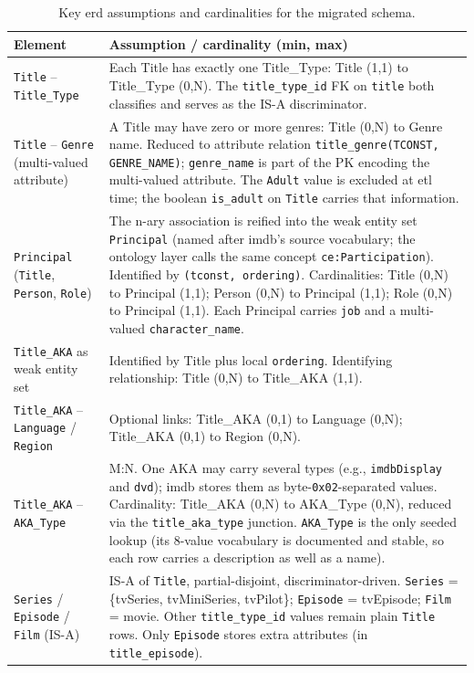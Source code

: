 \begin{table}[H]
\centering
\small
\caption{Key \ac{erd} assumptions and cardinalities for the migrated schema.}
\label{tab:erd-assumptions}
\begin{tabularx}{\textwidth}{lX}
\hline
\textbf{Element} & \textbf{Assumption / cardinality (min, max)} \\
\hline
\texttt{Title} -- \texttt{Title\_Type} & Each Title has exactly one Title\_Type: Title (1,1) to Title\_Type (0,N). The \texttt{title\_type\_id} FK on \texttt{title} both classifies and serves as the IS-A discriminator. \\
\texttt{Title} -- \texttt{Genre} (multi-valued attribute) & A Title may have zero or more genres: Title (0,N) to Genre name. Reduced to attribute relation \texttt{title\_genre(TCONST, GENRE\_NAME)}; \texttt{genre\_name} is part of the PK encoding the multi-valued attribute. The \texttt{Adult} value is excluded at \ac{etl} time; the boolean \texttt{is\_adult} on \texttt{Title} carries that information. \\
\texttt{Principal} (\texttt{Title}, \texttt{Person}, \texttt{Role}) & The n-ary association is reified into the weak entity set \texttt{Principal} (named after \ac{imdb}'s source vocabulary; the ontology layer calls the same concept \texttt{ce:Participation}). Identified by \texttt{(tconst, ordering)}. Cardinalities: Title (0,N) to Principal (1,1); Person (0,N) to Principal (1,1); Role (0,N) to Principal (1,1). Each Principal carries \texttt{job} and a multi-valued \texttt{character\_name}. \\
\texttt{Title\_AKA} as weak entity set & Identified by Title plus local \texttt{ordering}. Identifying relationship: Title (0,N) to Title\_AKA (1,1). \\
\texttt{Title\_AKA} -- \texttt{Language} / \texttt{Region} & Optional links: Title\_AKA (0,1) to Language (0,N); Title\_AKA (0,1) to Region (0,N). \\
\texttt{Title\_AKA} -- \texttt{AKA\_Type} & M:N. One AKA may carry several types (e.g., \texttt{imdbDisplay} and \texttt{dvd}); \ac{imdb} stores them as byte-\texttt{0x02}-separated values. Cardinality: Title\_AKA (0,N) to AKA\_Type (0,N), reduced via the \texttt{title\_aka\_type} junction. \texttt{AKA\_Type} is the only seeded lookup (its 8-value vocabulary is documented and stable, so each row carries a description as well as a name). \\
\texttt{Series} / \texttt{Episode} / \texttt{Film} (IS-A) & IS-A of \texttt{Title}, partial-disjoint, discriminator-driven. \texttt{Series} = \{tvSeries, tvMiniSeries, tvPilot\}; \texttt{Episode} = tvEpisode; \texttt{Film} = movie. Other \texttt{title\_type\_id} values remain plain \texttt{Title} rows. Only \texttt{Episode} stores extra attributes (in \texttt{title\_episode}). \\

\end{tabularx}
\end{table}
